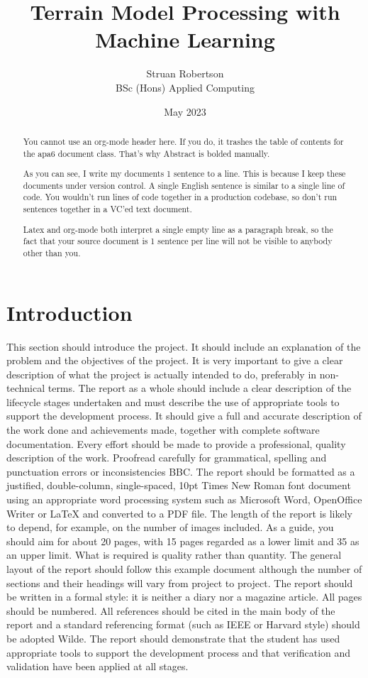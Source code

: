 \documentclass[twocolumn]{article}
\author{Struan Robertson \\ BSc (Hons) Applied Computing}
\date{May 2023}
\title{Terrain Model Processing with Machine Learning}
\begin{document}
\maketitle
\begin{abstract}

You cannot use an org-mode header here.
If you do, it trashes the table of contents for the apa6 document class.
That's why Abstract is bolded manually.

As you can see, I write my documents 1 sentence to a line.
This is because I keep these documents under version control.
A single English sentence is similar to a single line of code.
You wouldn't run lines of code together in a production codebase, so don't run sentences together in a VC'ed text document.

Latex and org-mode both interpret a single empty line as a paragraph break, so the fact that your source document is 1 sentence per line will not be visible to anybody other than you.

\end{abstract}

\section{Introduction}
\label{sec:org104e140}

This section should introduce the project.
It should include an explanation of the problem and the objectives of the project.
It is very important to give a clear description of what the project is actually intended to do, preferably in non-technical terms.
The report as a whole should include a clear description of the lifecycle stages undertaken and must describe the use of appropriate tools to support the development process.
It should give a full and accurate description of the work done and achievements made, together with complete software documentation.
Every effort should be made to provide a professional, quality description of the work.
Proofread carefully for grammatical, spelling and punctuation errors or inconsistencies BBC.
The report should be formatted as a justified, double-column, single-spaced, 10pt Times New Roman font document using an appropriate word processing system such as Microsoft Word, OpenOffice Writer or \LaTeX{} and converted to a PDF file.
The length of the report is likely to depend, for example, on the number of images included.
As a guide, you should aim for about 20 pages, with 15 pages regarded as a lower limit and 35 as an upper limit.
What is required is quality rather than quantity.
The general layout of the report should follow this example document although the number of sections and their headings will vary from project to project.
The report should be written in a formal style: it is neither a diary nor a magazine article.
All pages should be numbered.
All references should be cited in the main body of the report and a standard referencing format (such as IEEE or Harvard style) should be adopted Wilde.
The report should demonstrate that the student has used appropriate tools to support the development process and that verification and validation have been applied at all stages.
\end{document}
